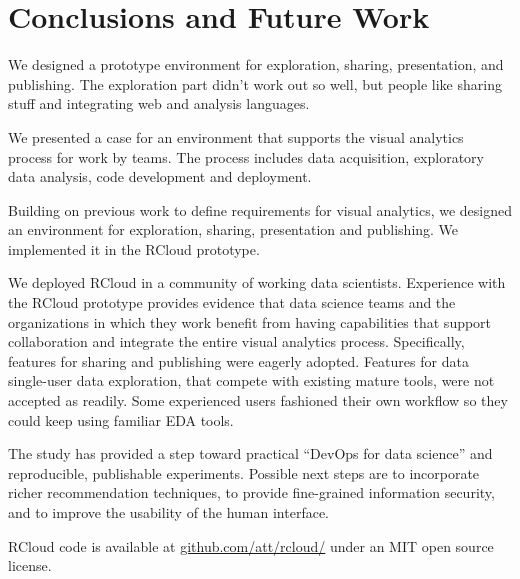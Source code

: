 \section{Conclusions and Future Work}

 We designed a prototype environment for exploration, sharing,
presentation, and publishing. The exploration part didn't work out so well,
but people like sharing stuff and integrating web and analysis languages.

We presented a case for an environment that supports the
visual analytics process for work by teams. The process
includes data acquisition, exploratory data analysis,
code development and deployment.

Building on previous work to define requirements for
visual analytics, we designed an environment
for exploration, sharing, presentation and publishing.
We implemented it in the RCloud prototype.

We deployed RCloud in a community of working data scientists.
Experience with the RCloud prototype provides evidence that data
science teams and the organizations in which they work benefit from
having capabilities that support collaboration and integrate
the entire visual analytics process. Specifically, features for
sharing and publishing were eagerly adopted. Features for data
single-user data exploration, that compete with existing mature
tools, were not accepted as readily. Some experienced users
fashioned their own workflow so they could keep using familiar EDA tools.

The study has provided a step toward practical ``DevOps for data science''
and reproducible, publishable experiments.  Possible next steps are
to incorporate richer recommendation techniques, to provide fine-grained
information security, and to improve the usability of the human interface.

RCloud code is available at \url{github.com/att/rcloud/}
under an MIT open source license.
